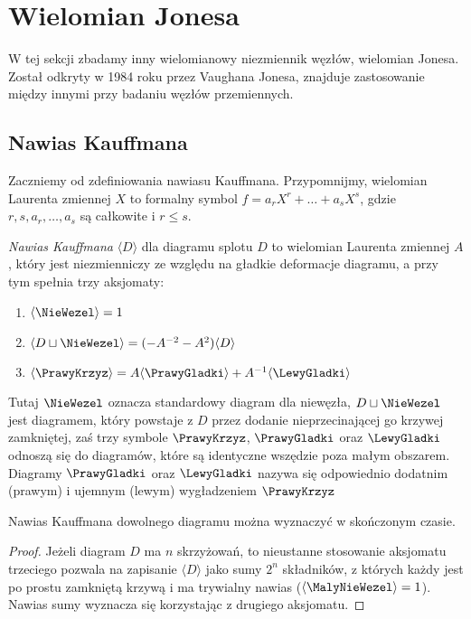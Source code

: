 \section{Wielomian Jonesa}
W tej sekcji zbadamy inny wielomianowy niezmiennik węzłów, wielomian Jonesa.
Został odkryty w 1984 roku przez Vaughana Jonesa, znajduje zastosowanie między innymi przy badaniu węzłów przemiennych.

\subsection{Nawias Kauffmana}
Zaczniemy od zdefiniowania nawiasu Kauffmana.
Przypomnijmy, wielomian Laurenta zmiennej $X$ to formalny symbol $f=a_r X^r + \ldots + a_s X^s$, gdzie $r, s, a_r, \ldots, a_s$ są całkowite i $r \le s$.

\begin{definicja}
	\emph{Nawias Kauffmana} $\langle D \rangle$ dla diagramu splotu $D$ to wielomian Laurenta zmiennej $A$, który jest niezmienniczy ze względu na gładkie deformacje diagramu, a przy tym spełnia trzy aksjomaty:
	\begin{enumerate}
		\item $\langle \NieWezel \rangle=1$
		\item $\langle D \sqcup \NieWezel \rangle = (-A^{-2} - A^2) \langle D \rangle$
		\item $\langle \PrawyKrzyz \rangle = A \langle \PrawyGladki \rangle + A^{-1} \langle \LewyGladki  \rangle$
	\end{enumerate}
\end{definicja}

Tutaj $\NieWezel$ oznacza standardowy diagram dla niewęzła, $D \sqcup \NieWezel$ jest diagramem, który powstaje z $D$ przez dodanie nieprzecinającej go krzywej zamkniętej, zaś trzy symbole $\PrawyKrzyz$, $\PrawyGladki$ oraz $\LewyGladki $ odnoszą się do diagramów, które są identyczne wszędzie poza małym obszarem.
Diagramy $\PrawyGladki$ oraz $\LewyGladki$ nazywa się odpowiednio dodatnim (prawym) i ujemnym (lewym) wygładzeniem $\PrawyKrzyz$

\begin{lemat}
	Nawias Kauffmana dowolnego diagramu można wyznaczyć w skończonym czasie.
\end{lemat}

\begin{proof}
	Jeżeli diagram $D$ ma $n$ skrzyżowań, to nieustanne stosowanie aksjomatu trzeciego pozwala na zapisanie $\langle D \rangle$ jako sumy $2^n$ składników, z których każdy jest po prostu zamkniętą krzywą i ma trywialny nawias ($\langle \MalyNieWezel \rangle = 1$).
	Nawias sumy wyznacza się korzystając z drugiego aksjomatu.
\end{proof}

